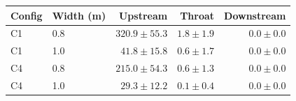 \begin{tabular}{@{}llrrr@{}}
\toprule
\textbf{Config} & \textbf{Width (m)} & \textbf{Upstream} & \textbf{Throat} & \textbf{Downstream} \\
\midrule
C1 & 0.8 & $320.9 \pm 55.3$ & $1.8 \pm 1.9$ & $0.0 \pm 0.0$ \\
C1 & 1.0 & $41.8 \pm 15.8$ & $0.6 \pm 1.7$ & $0.0 \pm 0.0$ \\
C4 & 0.8 & $215.0 \pm 54.3$ & $0.6 \pm 1.3$ & $0.0 \pm 0.0$ \\
C4 & 1.0 & $29.3 \pm 12.2$ & $0.1 \pm 0.4$ & $0.0 \pm 0.0$ \\
\bottomrule
\end{tabular}
